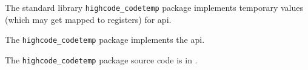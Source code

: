 
The standard library {\tt highcode\_codetemp} package implements temporary values (which may get mapped to registers) for  api.

The {\tt highcode\_codetemp} package implements the  api.

The {\tt highcode\_codetemp} package source code is in .



